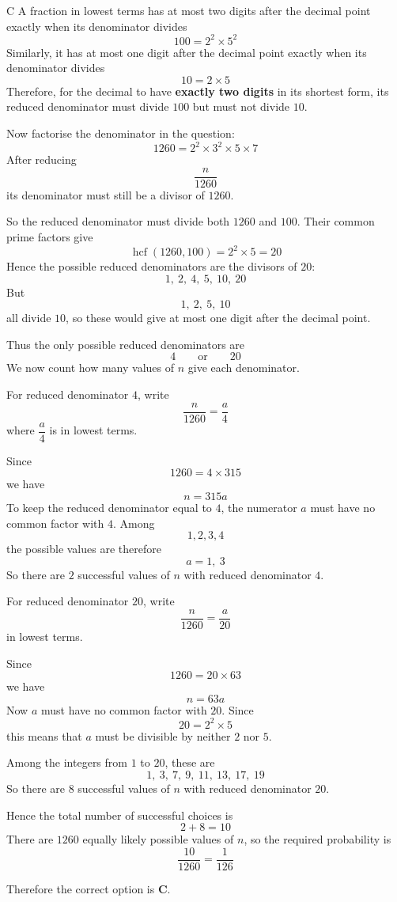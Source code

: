 \documentclass[11pt,a4paper]{article}
\begin{document}
\begin{enumerate}[label=\textbf{\arabic*.},leftmargin=*,itemsep=0pt,start=11]
\begin{djsSolution}{C}
A fraction in lowest terms has at most two digits after the decimal point exactly when its denominator divides
\[
100=2^2\times5^2
\]
Similarly, it has at most one digit after the decimal point exactly when its denominator divides
\[
10=2\times5
\]
Therefore, for the decimal to have \textbf{exactly two digits} in its shortest form, its reduced denominator must divide $100$ but must not divide $10$.

Now factorise the denominator in the question:
\[
1260=2^2\times3^2\times5\times7
\]
After reducing
\[
\frac{n}{1260}
\]
its denominator must still be a divisor of $1260$.

So the reduced denominator must divide both $1260$ and $100$. Their common prime factors give
\[
\operatorname{hcf}(1260,100)=2^2\times5=20
\]
Hence the possible reduced denominators are the divisors of $20$:
\[
1,\ 2,\ 4,\ 5,\ 10,\ 20
\]
But
\[
1,\ 2,\ 5,\ 10
\]
all divide $10$, so these would give at most one digit after the decimal point.

Thus the only possible reduced denominators are
\[
4
\qquad\text{or}\qquad
20
\]
We now count how many values of $n$ give each denominator.

For reduced denominator $4$, write
\[
\frac{n}{1260}=\frac{a}{4}
\]
where $\dfrac{a}{4}$ is in lowest terms.

Since
\[
1260=4\times315
\]
we have
\[
n=315a
\]
To keep the reduced denominator equal to $4$, the numerator $a$ must have no common factor with $4$. Among
\[
1,2,3,4
\]
the possible values are therefore
\[
a=1,\ 3
\]
So there are
\(
2
\)
successful values of $n$ with reduced denominator $4$.

For reduced denominator $20$, write
\[
\frac{n}{1260}=\frac{a}{20}
\]
in lowest terms.

Since
\[
1260=20\times63
\]
we have
\[
n=63a
\]
Now $a$ must have no common factor with $20$. Since
\[
20=2^2\times5
\]
this means that $a$ must be divisible by neither $2$ nor $5$.

Among the integers from $1$ to $20$, these are
\[
1,\ 3,\ 7,\ 9,\ 11,\ 13,\ 17,\ 19
\]
So there are
\(
8
\)
successful values of $n$ with reduced denominator $20$.

Hence the total number of successful choices is
\[
2+8=10
\]
There are $1260$ equally likely possible values of $n$, so the required probability is
\[
\frac{10}{1260}
=
\frac{1}{126}
\]

Therefore the correct option is \textbf{C}.
\end{djsSolution}
\end{enumerate}
\end{document}

